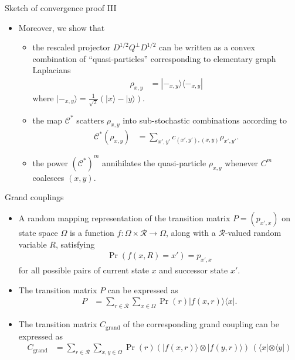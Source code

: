 \documentclass{beamer}
\renewcommand{\>}{\rangle}
\newcommand{\<}{\langle}
\newcommand{\cC}{\mathcal{C}}
\newcommand{\cR}{\mathcal{R}}
\begin{document}
\begin{frame}{Sketch of convergence proof III}
\begin{itemize}
    \item Moreover, we show that 

    \medskip
    \begin{itemize}
        \item the rescaled projector $D^{1/2} Q^\perp D^{1/2}$ can be written as a convex combination of ``quasi-particles'' corresponding to elementary graph Laplacians 
        \begin{align*}
            \rho_{x,y} 
            &=
            |-_{x,y}\>\<-_{x,y}|
        \end{align*} 
        where $|-_{x,y}\>=\frac{1}{\sqrt{2}}(|x\>-|y\>)$.

        \medskip
        \item the map $\cC^*$ scatters $\rho_{x,y}$ into sub-stochastic combinations according to
        \begin{align*}
            \cC^*(\rho_{x,y})
            &=
            \sum_{x',y'} c_{(x',y'),(x,y)} \rho_{x',y'}.
        \end{align*}

        \medskip
        \item the power $(\cC^*)^m$ annihilates the quasi-particle $\rho_{x,y}$ whenever $C^m$ coalesces $(x,y)$. 
    \end{itemize}
\end{itemize}
\end{frame}


\begin{frame}{Grand couplings}
\begin{itemize}
    \item A random mapping representation of the transition matrix $P=(p_{x',x})$ on state space $\Omega$ is a function $f : \Omega \times \cR \rightarrow \Omega$, along with a $\cR$-valued random variable $R$, satisfying
    \begin{align*}
        \Pr(f(x,R)=x') = p_{x',x}
    \end{align*}
    for all possible pairs of current state $x$ and successor state $x'$.

    \medskip
    \item The transition matrix $P$ can be expressed as
    \begin{align*}
        P 
        &= \sum_{r\in\cR} \sum_{x\in\Omega} \Pr(r) |f(x,r)\>\<x|.
    \end{align*}

    \medskip
    \item The transition matrix $C_\mathrm{grand}$ of the corresponding grand coupling can be expressed as
    \begin{align*}
        C_\mathrm{grand} 
        &=
        \sum_{r\in\cR} \sum_{x,y\in\Omega} \Pr(r) (|f(x,r)\> \otimes |f(y,r)\>) \, (\<x| \otimes \<y|)
    \end{align*}
\end{itemize}
    
\end{frame}
\end{document}
